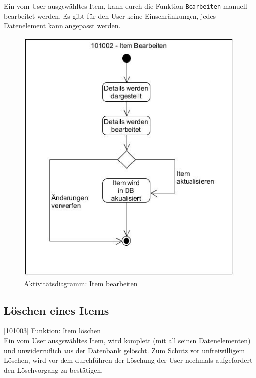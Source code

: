 Ein vom User ausgewähltes Item, kann durch die Funktion {\color{IndianRed}\texttt{Bearbeiten}} manuell bearbeitet werden. Es gibt für den User keine Einschränkungen, jedes Datenelement kann angepasst werden.

\begin{figure}[htbp]
	\centering
	\includegraphics[scale=0.6]{pic/101002}
	\caption{Aktivitätsdiagramm: Item bearbeiten}
\end{figure}

\subsection{Löschen eines Items}

[101003] Funktion: Item löschen\\

Ein vom User ausgewähltes Item, wird komplett (mit all seinen Datenelementen) und unwiderruflich aus der Datenbank gelöscht. Zum Schutz vor unfreiwilligem Löschen, wird vor dem durchführen der Löschung der User nochmals aufgefordert den Löschvorgang zu bestätigen.


